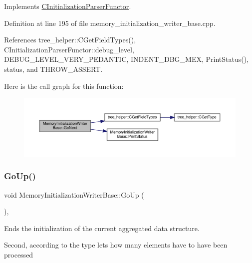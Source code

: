 Implements \hyperlink{classCInitializationParserFunctor_a4f9a305b8ecfba8a372583123b2878ed}{C\+Initialization\+Parser\+Functor}.



Definition at line 195 of file memory\+\_\+initialization\+\_\+writer\+\_\+base.\+cpp.



References tree\+\_\+helper\+::\+C\+Get\+Field\+Types(), C\+Initialization\+Parser\+Functor\+::debug\+\_\+level, D\+E\+B\+U\+G\+\_\+\+L\+E\+V\+E\+L\+\_\+\+V\+E\+R\+Y\+\_\+\+P\+E\+D\+A\+N\+T\+IC, I\+N\+D\+E\+N\+T\+\_\+\+D\+B\+G\+\_\+\+M\+EX, Print\+Status(), status, and T\+H\+R\+O\+W\+\_\+\+A\+S\+S\+E\+RT.

Here is the call graph for this function\+:
\nopagebreak
\begin{figure}[H]
\begin{center}
\leavevmode
\includegraphics[width=350pt]{d3/d26/classMemoryInitializationWriterBase_a6b67daf4f3e0a2ff88bc824c80f11ea6_cgraph}
\end{center}
\end{figure}
\mbox{\label{classMemoryInitializationWriterBase_a0ff1c989969769e131c36172cc3f8ce3}} 
\subsubsection{\texorpdfstring{Go\+Up()}{GoUp()}}
{\footnotesize\ttfamily void Memory\+Initialization\+Writer\+Base\+::\+Go\+Up (\begin{DoxyParamCaption}{ }\end{DoxyParamCaption})\hspace{0.3cm}{\ttfamily [override]}, {\ttfamily [virtual]}}



Ends the initialization of the current aggregated data structure. 

Second, according to the type let\textquotesingle{}s how many elements have to have been processed

